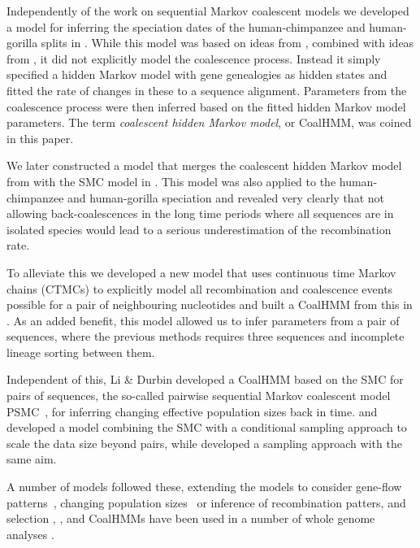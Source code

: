 \documentclass[graybox]{svmult}
\begin{document}
Independently of the work on sequential Markov coalescent models we developed a model for inferring the speciation dates of the human-chimpanzee and human-gorilla splits in \citet{Hobolth:2007gza}. While this model was based on ideas from \citet{Wiuf:1999gua}, combined with ideas from \citet{Takahata:1995kl}, it did not explicitly model the coalescence process. Instead it simply specified a hidden Markov model with gene genealogies as hidden states and fitted the rate of changes in these to a sequence alignment. Parameters from the coalescence process were then inferred based on the fitted hidden Markov model parameters. The term \emph{coalescent hidden Markov model}, or CoalHMM, was coined in this paper.

We later constructed a model that merges the coalescent hidden Markov model from \citet{Hobolth:2007gza} with the SMC model in \citet{Dutheil:2009dta}. This model was also applied to the human-chimpanzee and human-gorilla speciation and revealed very clearly that not allowing back-coalescences in the long time periods where all sequences are in isolated species would lead to a serious underestimation of the recombination rate.

To alleviate this we developed a new model that uses continuous time Markov chains (CTMCs) to explicitly model all recombination and coalescence events possible for a pair of neighbouring nucleotides and built a CoalHMM from this in \citet{Mailund:2011dva}. As an added benefit, this model allowed us to infer parameters from a pair of sequences, where the previous methods requires three sequences and incomplete lineage sorting between them.

Independent of this, Li \& Durbin developed a CoalHMM based on the SMC for pairs of sequences, the so-called pairwise sequential Markov coalescent model PSMC~\cite{Li:2011eza}, for inferring changing effective population sizes back in time. \citet{Paul:2010iba} and \citet{Paul:2011gva} developed a model combining the SMC with a conditional sampling approach to scale the data size beyond pairs, while \citet{Rasmussen:2014cqa} developed a sampling approach with the same aim.

A number of models followed these, extending the models to consider gene-flow patterns~\cite{Steinrucken:2013kba,Mailund:2012ewa}, changing population sizes~\cite{Sheehan:2013iba,Schiffels:2014cua} or inference of recombination patters, and selection \cite{Munch:2014cba, Munch:2014cwa}, \cite{Dutheil:2015kl, Munch:2016dn}, and CoalHMMs have been used in a number of whole genome analyses \cite{Locke:2011gna, Hobolth:2011dia, Scally:2012ika, Prufer:2012ea, Miller:2012cxa, Abascal:2016cy, PradoMartinez:2013dna, Jonsson:2014fga}.
\end{document}
